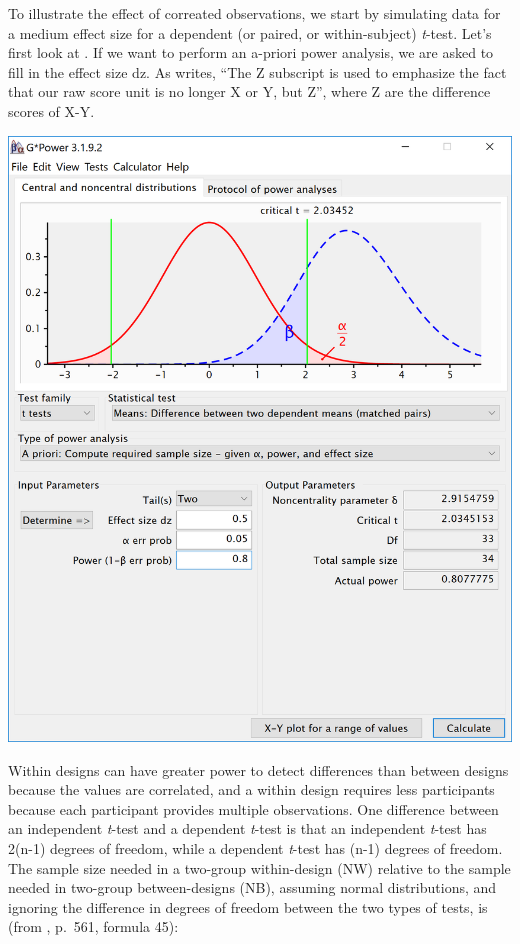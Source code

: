 \documentclass[]{book}
\begin{document}
To illustrate the effect of correated observations, we start by simulating data for a medium effect size for a dependent (or paired, or within-subject) \emph{t}-test. Let's first look at \citet{faul2007g}. If we want to perform an a-priori power analysis, we are asked to fill in the effect size dz. As \citet{cohen1988spa} writes, ``The Z subscript is used to emphasize the fact that our raw score unit is no longer X or Y, but Z'', where Z are the difference scores of X-Y.

\includegraphics{screenshots/gpower_9.png}

Within designs can have greater power to detect differences than between designs because the values are correlated, and a within design requires less participants because each participant provides multiple observations. One difference between an independent \emph{t}-test and a dependent \emph{t}-test is that an independent \emph{t}-test has 2(n-1) degrees of freedom, while a dependent \emph{t}-test has (n-1) degrees of freedom. The sample size needed in a two-group within-design (NW) relative to the sample needed in two-group between-designs (NB), assuming normal distributions, and ignoring the difference in degrees of freedom between the two types of tests, is (from \citet{maxwell_designing_2004}, p.~561, formula 45):
\end{document}
